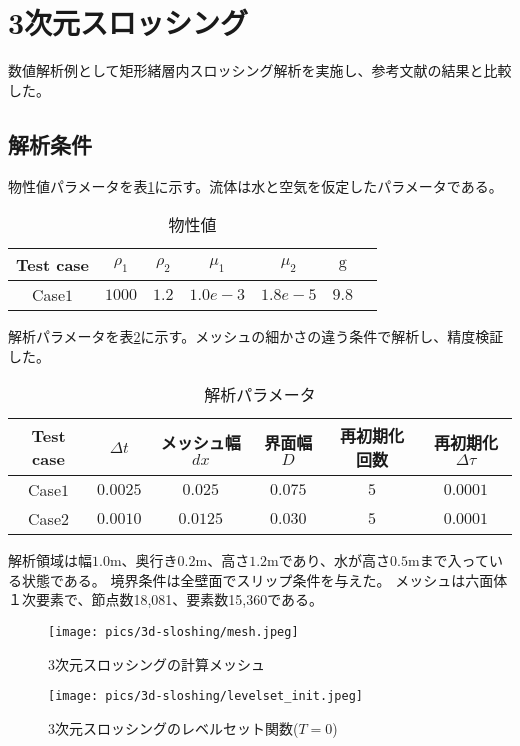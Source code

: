 \newpage
\section{3次元スロッシング}

数値解析例として矩形緒層内スロッシング解析を実施し、参考文献の結果と比較した。

\subsection{解析条件}

物性値パラメータを表\ref{table:3d-sloshing-material-property}に示す。流体は水と空気を仮定したパラメータである。
\renewcommand{\arraystretch}{1}
\begin{table}[H]
	\centering
	\caption{物性値}
	\begin{tabular}{ccccccc}
		\hline
		Test case & $\rho_1$ & $\rho_2$ & $\mu_1$ & $\mu_2$ & $\mathrm{g}$ \\
		\hline 
		Case$1$ & $1000$ & $1.2$ & $1.0e-3$ & $1.8e-5$ & $9.8$ \\
		\hline         
	\end{tabular}
	\label{table:3d-sloshing-material-property}
\end{table}
\renewcommand{\arraystretch}{1.0}

解析パラメータを表\ref{table:3d-sloshing-parameter}に示す。メッシュの細かさの違う条件で解析し、精度検証した。
\renewcommand{\arraystretch}{1}
\begin{table}[H]
	\centering
	\caption{解析パラメータ}
	\begin{tabular}{cccccc}
		\hline
		Test case & $\Delta t$ & メッシュ幅$dx$ & 界面幅$D$ & 再初期化回数 & 再初期化$\Delta \tau$\\
		\hline 
		Case$1$ & $0.0025$ & $0.025$ & $0.075$ & $5$ & $0.0001$\\
		Case$2$ & $0.0010$ & $0.0125$ & $0.030$ & $5$ & $0.0001$\\
		\hline         
	\end{tabular}
	\label{table:3d-sloshing-parameter}
\end{table}
\renewcommand{\arraystretch}{1.0}

解析領域は幅$1.0\mathrm{m}$、奥行き$0.2\mathrm{m}$、高さ$1.2\mathrm{m}$であり、水が高さ$0.5\mathrm{m}$まで入っている状態である。
境界条件は全壁面でスリップ条件を与えた。
メッシュは六面体１次要素で、節点数18,081、要素数15,360である。

\begin{figure}[H]
	\centering
	\begin{minipage}[b]{0.49\columnwidth}
	    \centering
	    \texttt{[image: pics/3d-sloshing/mesh.jpeg]}
		\caption{3次元スロッシングの計算メッシュ}
		\label{fig:3d-sloshing-mesh}
	\end{minipage}
	\begin{minipage}[b]{0.49\columnwidth}
	    \centering
	    \texttt{[image: pics/3d-sloshing/levelset\_init.jpeg]}
		\caption{3次元スロッシングのレベルセット関数($T=0$)}
		\label{fig:3d-sloshing-levelset_t0_3d}
	\end{minipage}
\end{figure}


